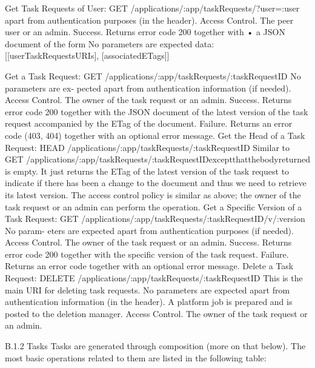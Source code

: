Get Task Requests of User:
GET /applications/:app/taskRequests/?user=:user apart from authentication purposes (in the header).
Access Control. The peer user or an admin. Success. Returns error code 200 together with
• a JSON document of the form {
No parameters are expected
      data: [[userTaskRequestsURIs], [associatedETags]]
    }

    Get a Task Request:
GET /applications/:app/taskRequests/:taskRequestID No parameters are ex- pected apart from authentication information (if needed).
Access Control. The owner of the task request or an admin.
Success. Returns error code 200 together with the JSON document of the latest
version of the task request accompanied by the ETag of the document.
Failure. Returns an error code (403, 404) together with an optional error message.
Get the Head of a Task Request:
HEAD /applications/:app/taskRequests/:taskRequestID Similar to
GET /applications/:app/taskRequests/:taskRequestIDexceptthatthebodyreturned is empty. It just returns the ETag of the latest version of the task request to indicate if there has been a change to the document and thus we need to retrieve its latest version. The access control policy is similar as above; the owner of the task request or an admin can perform the operation.
Get a Specific Version of a Task Request:
GET /applications/:app/taskRequests/:taskRequestID/v/:version No param- eters are expected apart from authentication purposes (if needed).
Access Control. The owner of the task request or an admin.
Success. Returns error code 200 together with the specific version of the task request. Failure. Returns an error code together with an optional error message.
Delete a Task Request: DELETE /applications/:app/taskRequests/:taskRequestID
This is the main URI for deleting task requests. No parameters are expected apart from authentication information (in the header). A platform job is prepared and is posted to the deletion manager.
Access Control. The owner of the task request or an admin.

B.1.2 Tasks
Tasks are generated through composition (more on that below). The most basic operations related to them are listed in the following table:
 
